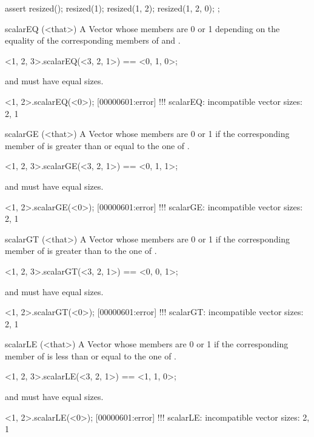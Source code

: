 \begin{urbiscriptapi}
\begin{urbiscript}
assert
{
  resized();
  resized(1);
  resized(1, 2);
  resized(1, 2, 0);
};
\end{urbiscript}


\item[scalarEQ](<that>)%
  A Vector whose members are 0 or 1 depending on the equality of the
  corresponding members of \this and \that.
\begin{urbiassert}
  <1, 2, 3>.scalarEQ(<3, 2, 1>) == <0, 1, 0>;
\end{urbiassert}
  \this and \that must have equal sizes.
\begin{urbiscript}
<1, 2>.scalarEQ(<0>);
[00000601:error] !!! scalarEQ: incompatible vector sizes: 2, 1
\end{urbiscript}


\item[scalarGE](<that>)%
  A Vector whose members are 0 or 1 if the corresponding member of \this is
  greater than or equal to the one of \that.
\begin{urbiassert}
  <1, 2, 3>.scalarGE(<3, 2, 1>) == <0, 1, 1>;
\end{urbiassert}

  \this and \that must have equal sizes.
\begin{urbiscript}
<1, 2>.scalarGE(<0>);
[00000601:error] !!! scalarGE: incompatible vector sizes: 2, 1
\end{urbiscript}


\item[scalarGT](<that>)%
  A Vector whose members are 0 or 1 if the corresponding member of \this is
  greater than to the one of \that.
\begin{urbiassert}
  <1, 2, 3>.scalarGT(<3, 2, 1>) == <0, 0, 1>;
\end{urbiassert}

  \this and \that must have equal sizes.
\begin{urbiscript}
<1, 2>.scalarGT(<0>);
[00000601:error] !!! scalarGT: incompatible vector sizes: 2, 1
\end{urbiscript}


\item[scalarLE](<that>)%
  A Vector whose members are 0 or 1 if the corresponding member of \this is
  less than or equal to the one of \that.
\begin{urbiassert}
  <1, 2, 3>.scalarLE(<3, 2, 1>) == <1, 1, 0>;
\end{urbiassert}

  \this and \that must have equal sizes.
\begin{urbiscript}
<1, 2>.scalarLE(<0>);
[00000601:error] !!! scalarLE: incompatible vector sizes: 2, 1
\end{urbiscript}



\end{urbiscriptapi}
